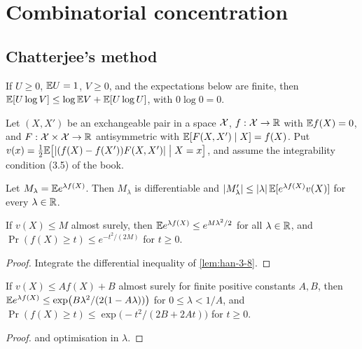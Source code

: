 \chapter{Combinatorial concentration}
\label{chap:combinatorial-concentration}

\section{Chatterjee's method}

\begin{lemma}
  \label{lem:young-entropy}
  If $U\ge0$, $\mathbb{E} U=1$, $V\ge0$, and the expectations below are finite, then $\mathbb{E}[U\log V]\le\log\mathbb{E} V+\mathbb{E}[U\log U]$, with $0\log0=0$.
\end{lemma}

\begin{definition}
  \label{def:chatterjee}
  Let $(X,X')$ be an exchangeable pair in a space $\mathcal{X}$, $f:\mathcal{X}\to\mathbb{R}$ with $\mathbb{E} f(X)=0$, and $F:\mathcal{X}\times\mathcal{X}\to\mathbb{R}$ antisymmetric with $\mathbb{E}[F(X,X')\mid X]=f(X)$. Put $v(x)=\frac12\mathbb{E}\bigl[|(f(X)-f(X'))F(X,X')|\bigm|X=x\bigr]$, and assume the integrability condition (3.5) of the book.
\end{definition}

\begin{lemma}
  \label{lem:han-3-8}
  Let $M_\lambda=\mathbb{E} e^{\lambda f(X)}$. Then $M_\lambda$ is differentiable and $|M'_\lambda|\le|\lambda|\,\mathbb{E}[e^{\lambda f(X)}v(X)]$ for every $\lambda\in\mathbb{R}$.
\end{lemma}

\begin{lemma}
  \label{lem:han-3-9}
  If $v(X)\le M$ almost surely, then $\mathbb{E} e^{\lambda f(X)}\le e^{M\lambda^2/2}$ for all $\lambda\in\mathbb{R}$, and $\Pr(f(X)\ge t)\le e^{-t^2/(2M)}$ for $t\ge0$.
\end{lemma}
\begin{proof}
  Integrate the differential inequality of \cref{lem:han-3-8}.
\end{proof}

\begin{lemma}
  \label{lem:han-3-10}
  If $v(X)\le Af(X)+B$ almost surely for finite positive constants $A,B$, then $\mathbb{E} e^{\lambda f(X)}\le\exp\bigl(B\lambda^2/(2(1-A\lambda))\bigr)$ for $0\le\lambda<1/A$, and $\Pr(f(X)\ge t)\le\exp\bigl(-t^2/(2B+2At)\bigr)$ for $t\ge0$.
\end{lemma}
\begin{proof}
   and optimisation in $\lambda$.
\end{proof}

